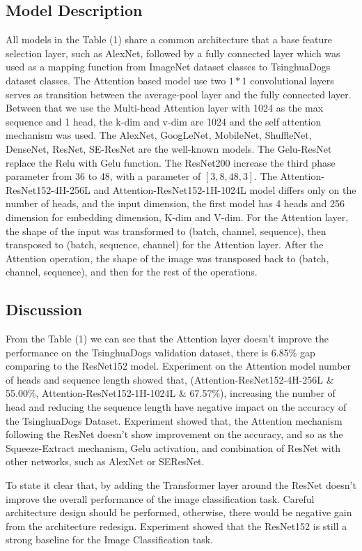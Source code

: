 \documentclass[runningheads]{llncs}
\begin{document}
\subsection{Model Description}

All models in the Table (1) share a common architecture that a base feature selection layer, such as AlexNet, followed by a fully connected layer which was used as a mapping function from ImageNet dataset classes to TsinghuaDogs dataset classes.
The Attention based model use two $1*1$ convolutional layers serves as transition between the average-pool layer and the fully connected layer.
Between that we use the Multi-head Attention layer with 1024 as the max sequence and 1 head, the k-dim and v-dim are 1024 and the self attention mechanism was used.
The AlexNet, GoogLeNet, MobileNet, ShuffleNet, DenseNet, ResNet, SE-ResNet are the well-known models. The Gelu-ResNet replace the Relu with Gelu function.
The ResNet200 increase the third phase parameter from 36 to 48, with a parameter of $[3,8,48,3]$.
The Attention-ResNet152-4H-256L and Attention-ResNet152-1H-1024L model differs only on the number of heads, and the input dimension, the first model has 4 heads and 256 dimension for embedding dimension, K-dim and V-dim.
For the Attention layer, the shape of the input was transformed to (batch, channel, sequence), then transposed to (batch, sequence, channel) for the Attention layer.
After the Attention operation, the shape of the image was transposed back to (batch, channel, sequence), and then for the rest of the operations.

\subsection{Discussion}

From the Table (1) we can see that the Attention layer doesn't improve the performance on the TsinghuaDogs validation dataset, there is 6.85\% gap comparing to the ResNet152 model.
Experiment on the Attention model number of heads and sequence length showed that, (Attention-ResNet152-4H-256L \&  	55.00\%, Attention-ResNet152-1H-1024L \&  	67.57\%),
increasing the number of head and reducing the sequence length have negative impact on the accuracy of the TsinghuaDogs Dataset.
Experiment showed that, the Attention mechanism following the ResNet doesn't show improvement on the accuracy, and so as the Squeeze-Extract mechanism, Gelu activation, and combination of ResNet with other networks, such as AlexNet or SEResNet.
\par To state it clear that, by adding the Transformer layer around the ResNet doesn't improve the overall performance of the image classification task.
Careful architecture design should be performed, otherwise, there would be negative gain from the architecture redesign.
Experiment showed that the ResNet152 is still a strong baseline for the Image Classification task.
\end{document}

